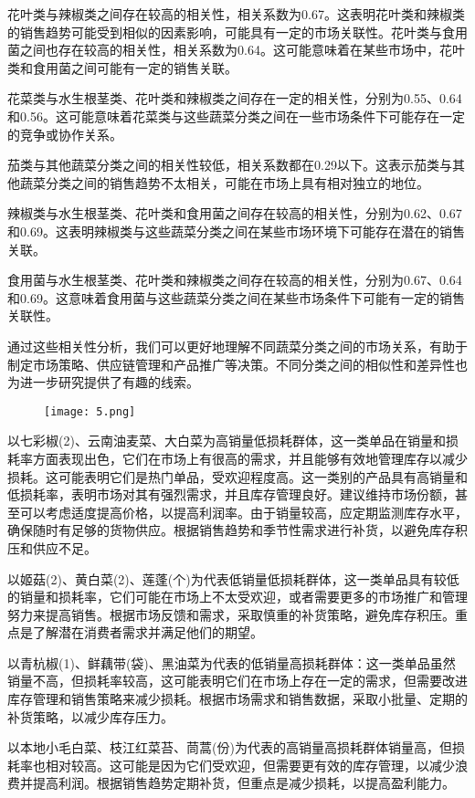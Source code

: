 \documentclass[withoutpreface,bwprint]{cumcmthesis} %
\begin{document}
	花叶类与辣椒类之间存在较高的相关性，相关系数为0.67。这表明花叶类和辣椒类的销售趋势可能受到相似的因素影响，可能具有一定的市场关联性。花叶类与食用菌之间也存在较高的相关性，相关系数为0.64。这可能意味着在某些市场中，花叶类和食用菌之间可能有一定的销售关联。
	
	花菜类与水生根茎类、花叶类和辣椒类之间存在一定的相关性，分别为0.55、0.64和0.56。这可能意味着花菜类与这些蔬菜分类之间在一些市场条件下可能存在一定的竞争或协作关系。
	
	茄类与其他蔬菜分类之间的相关性较低，相关系数都在0.29以下。这表示茄类与其他蔬菜分类之间的销售趋势不太相关，可能在市场上具有相对独立的地位。
	
	辣椒类与水生根茎类、花叶类和食用菌之间存在较高的相关性，分别为0.62、0.67和0.69。这表明辣椒类与这些蔬菜分类之间在某些市场环境下可能存在潜在的销售关联。
	
	食用菌与水生根茎类、花叶类和辣椒类之间存在较高的相关性，分别为0.67、0.64和0.69。这意味着食用菌与这些蔬菜分类之间在某些市场条件下可能有一定的销售关联性。
	
	通过这些相关性分析，我们可以更好地理解不同蔬菜分类之间的市场关系，有助于制定市场策略、供应链管理和产品推广等决策。不同分类之间的相似性和差异性也为进一步研究提供了有趣的线索。
		\begin{figure}[H]
		\centering
		\texttt{[image: 5.png]}
	\end{figure}
	以七彩椒(2)、云南油麦菜、大白菜为高销量低损耗群体，这一类单品在销量和损耗率方面表现出色，它们在市场上有很高的需求，并且能够有效地管理库存以减少损耗。这可能表明它们是热门单品，受欢迎程度高。这一类别的产品具有高销量和低损耗率，表明市场对其有强烈需求，并且库存管理良好。建议维持市场份额，甚至可以考虑适度提高价格，以提高利润率。由于销量较高，应定期监测库存水平，确保随时有足够的货物供应。根据销售趋势和季节性需求进行补货，以避免库存积压和供应不足。
	
	以姬菇(2)、黄白菜(2)、莲蓬(个)为代表低销量低损耗群体，这一类单品具有较低的销量和损耗率，它们可能在市场上不太受欢迎，或者需要更多的市场推广和管理努力来提高销售。根据市场反馈和需求，采取慎重的补货策略，避免库存积压。重点是了解潜在消费者需求并满足他们的期望。
	
	以青杭椒(1)、鲜藕带(袋)、黑油菜为代表的低销量高损耗群体：这一类单品虽然销量不高，但损耗率较高，这可能表明它们在市场上存在一定的需求，但需要改进库存管理和销售策略来减少损耗。根据市场需求和销售数据，采取小批量、定期的补货策略，以减少库存压力。
	
	以本地小毛白菜、枝江红菜苔、茼蒿(份)为代表的高销量高损耗群体销量高，但损耗率也相对较高。这可能是因为它们受欢迎，但需要更有效的库存管理，以减少浪费并提高利润。根据销售趋势定期补货，但重点是减少损耗，以提高盈利能力。
	
\end{document}
